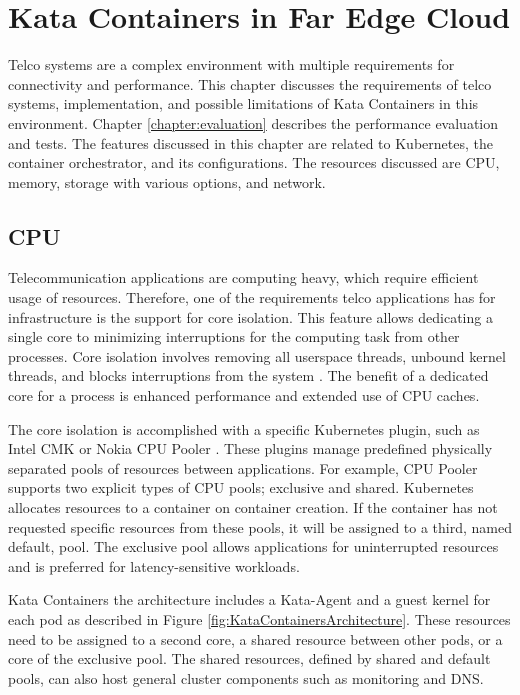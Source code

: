 \chapter{Kata Containers in Far Edge Cloud}
\label{chapter:implementation}

Telco systems are a complex environment with multiple requirements for connectivity and performance. This chapter discusses the requirements of telco systems, implementation, and possible limitations of Kata Containers in this environment. Chapter \ref{chapter:evaluation} describes the performance evaluation and tests. The features discussed in this chapter are related to Kubernetes, the container orchestrator, and its configurations. The resources discussed are CPU, memory, storage with various options, and network.

\section{CPU}

Telecommunication applications are computing heavy, which require efficient usage of resources. Therefore, one of the requirements telco applications has for infrastructure is the support for core isolation. This feature allows dedicating a single core to minimizing interruptions for the computing task from other processes. Core isolation involves removing all userspace threads, unbound kernel threads, and blocks interruptions from the system \cite{CPUisolation}. The benefit of a dedicated core for a process is enhanced performance and extended use of CPU caches.

The core isolation is accomplished with a specific Kubernetes plugin, such as Intel CMK \cite{IntelCMK} or Nokia CPU Pooler \cite{NokiaCPUPooler}. These plugins manage predefined physically separated pools of resources between applications. For example, CPU Pooler supports two explicit types of CPU pools; exclusive and shared. Kubernetes allocates resources to a container on container creation. If the container has not requested specific resources from these pools, it will be assigned to a third, named default, pool. The exclusive pool allows applications for uninterrupted resources and is preferred for latency-sensitive workloads.

Kata Containers the architecture includes a Kata-Agent and a guest kernel for each pod as described in Figure \ref{fig:KataContainersArchitecture}. These resources need to be assigned to a second core, a shared resource between other pods, or a core of the exclusive pool. The shared resources, defined by shared and default pools, can also host general cluster components such as monitoring and DNS.


